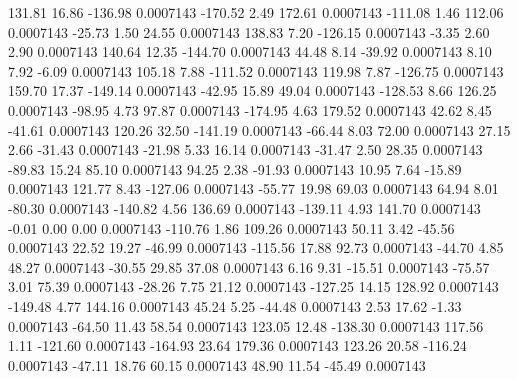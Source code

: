       131.81       16.86     -136.98     0.0007143
     -170.52        2.49      172.61     0.0007143
     -111.08        1.46      112.06     0.0007143
      -25.73        1.50       24.55     0.0007143
      138.83        7.20     -126.15     0.0007143
       -3.35        2.60        2.90     0.0007143
      140.64       12.35     -144.70     0.0007143
       44.48        8.14      -39.92     0.0007143
        8.10        7.92       -6.09     0.0007143
      105.18        7.88     -111.52     0.0007143
      119.98        7.87     -126.75     0.0007143
      159.70       17.37     -149.14     0.0007143
      -42.95       15.89       49.04     0.0007143
     -128.53        8.66      126.25     0.0007143
      -98.95        4.73       97.87     0.0007143
     -174.95        4.63      179.52     0.0007143
       42.62        8.45      -41.61     0.0007143
      120.26       32.50     -141.19     0.0007143
      -66.44        8.03       72.00     0.0007143
       27.15        2.66      -31.43     0.0007143
      -21.98        5.33       16.14     0.0007143
      -31.47        2.50       28.35     0.0007143
      -89.83       15.24       85.10     0.0007143
       94.25        2.38      -91.93     0.0007143
       10.95        7.64      -15.89     0.0007143
      121.77        8.43     -127.06     0.0007143
      -55.77       19.98       69.03     0.0007143
       64.94        8.01      -80.30     0.0007143
     -140.82        4.56      136.69     0.0007143
     -139.11        4.93      141.70     0.0007143
       -0.01        0.00        0.00     0.0007143
     -110.76        1.86      109.26     0.0007143
       50.11        3.42      -45.56     0.0007143
       22.52       19.27      -46.99     0.0007143
     -115.56       17.88       92.73     0.0007143
      -44.70        4.85       48.27     0.0007143
      -30.55       29.85       37.08     0.0007143
        6.16        9.31      -15.51     0.0007143
      -75.57        3.01       75.39     0.0007143
      -28.26        7.75       21.12     0.0007143
     -127.25       14.15      128.92     0.0007143
     -149.48        4.77      144.16     0.0007143
       45.24        5.25      -44.48     0.0007143
        2.53       17.62       -1.33     0.0007143
      -64.50       11.43       58.54     0.0007143
      123.05       12.48     -138.30     0.0007143
      117.56        1.11     -121.60     0.0007143
     -164.93       23.64      179.36     0.0007143
      123.26       20.58     -116.24     0.0007143
      -47.11       18.76       60.15     0.0007143
       48.90       11.54      -45.49     0.0007143
